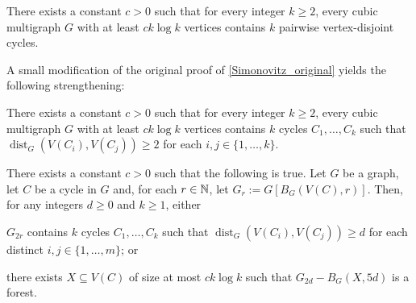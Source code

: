 \documentclass{patmorin}
\renewcommand{\ge}{\geqslant}
\DeclareMathOperator{\dist}{dist}
\begin{document}
\begin{lem}[Simonovitz] \label{Simonovitz_original}
  There exists a constant $c>0$ such that for every integer $k\ge 2$, every cubic multigraph $G$ with at least $ck\log k$ vertices contains $k$ pairwise vertex-disjoint cycles.
\end{lem}

A small modification of the original  proof of \cref{Simonovitz_original} yields the following strengthening:

\begin{lem}\label{Simonovitz_distance}
  There exists a constant $c>0$ such that for every integer $k\ge 2$, every cubic multigraph $G$ with at least $ck\log k$ vertices contains $k$ cycles $C_1,\ldots,C_k$ such that $\dist_G(V(C_i),V(C_j))\ge 2$ for each $i,j\in\{1,\ldots,k\}$.
\end{lem}

\begin{lem}
  There exists a constant $c>0$ such that the following is true.
  Let $G$ be a graph, let $C$ be a cycle in $G$ and, for each $r\in\mathbb{N}$, let $G_r:=G[B_G(V(C),r)]$.  Then, for any integers $d\ge 0$ and $k\ge 1$, either
  \begin{compactenum}
    \item $G_{2r}$ contains $k$ cycles $C_1,\ldots,C_k$ such that $\dist_G(V(C_i),V(C_j))\ge d$ for each distinct $i,j\in\{1,\ldots,m\}$; or
    \item there exists $X\subseteq V(C)$ of size at most $ck\log k$ such that $G_{2d}-B_G(X,5d)$ is a forest.
  \end{compactenum}
\end{lem}
\end{document}
